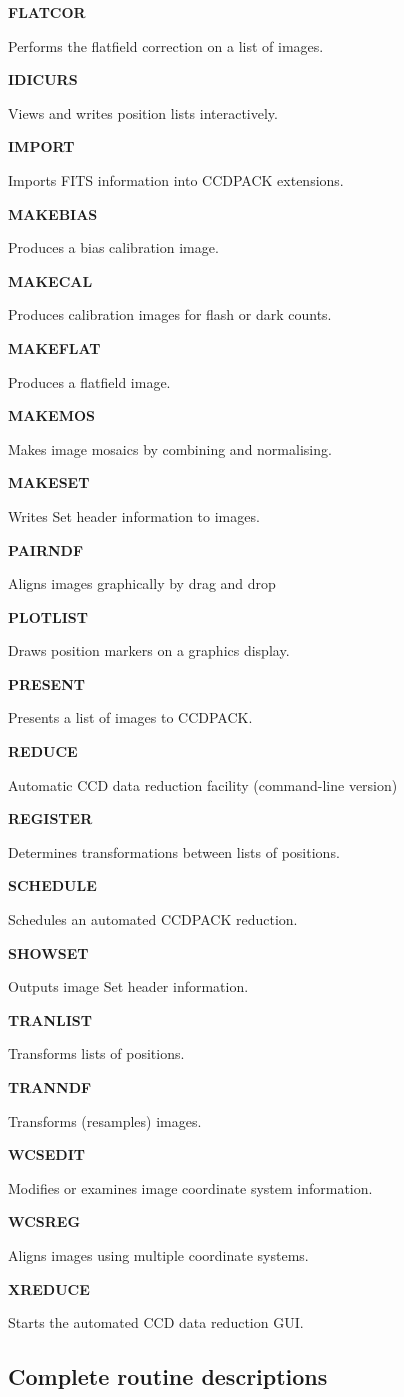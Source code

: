 \documentclass[twoside,11pt]{article}
\newenvironment{latexonly}{}{}
\renewcommand{\_}{\texttt{\symbol{95}}}
\newcommand{\quickdes}[3]{
                         \parbox{1.1in}{\bf #1}
                         \parbox{4.4in}{\raggedright #2 \dotfill}
                         \parbox{0.6in}{\pageref{#3}}
                         \vspace*{0.2in}}
\begin{document}
\begin{latexonly}
\quickdes{FLATCOR}{Performs the flatfield correction on a list of images.}
                  {FLATCOR}

\quickdes{IDICURS}{Views and writes position lists interactively.}{IDICURS}

\newpage

\quickdes{IMPORT}{Imports FITS information into CCDPACK extensions.}{IMPORT}

\quickdes{MAKEBIAS}{Produces a bias calibration image.}{MAKEBIAS}

\quickdes{MAKECAL}{Produces calibration images for flash or dark counts.}
                  {MAKECAL}

\quickdes{MAKEFLAT}{Produces a flatfield image.}
                   {MAKEFLAT}

\quickdes{MAKEMOS}{Makes image mosaics by combining and normalising.}
                  {MAKEMOS}

\quickdes{MAKESET}{Writes Set header information to images.}{MAKESET}

\quickdes{PAIRNDF}{Aligns images graphically by drag and drop}{PAIRNDF}

\quickdes{PLOTLIST}{Draws position markers on a graphics display.}
                   {PLOTLIST}

\quickdes{PRESENT}{Presents a list of images to CCDPACK.}{PRESENT}

\quickdes{REDUCE}{Automatic CCD data reduction facility (command-line version)}
                 {REDUCE}

\quickdes{REGISTER}{Determines transformations between lists of positions.}
                   {REGISTER}

\quickdes{SCHEDULE}{Schedules an automated CCDPACK reduction.}{SCHEDULE}

\quickdes{SHOWSET}{Outputs image Set header information.}{SHOWSET}

\quickdes{TRANLIST}{Transforms lists of positions.}
                   {TRANLIST}

\quickdes{TRANNDF}{Transforms (resamples) images.} {TRANNDF}

\quickdes{WCSEDIT}{Modifies or examines image coordinate system information.}
                  {WCSEDIT}

\quickdes{WCSREG}{Aligns images using multiple coordinate systems.}{WCSREG}

\quickdes{XREDUCE}{Starts the automated CCD data reduction GUI.}{XREDUCE}
\end{latexonly}

\subsection{Complete routine descriptions \label{descriptions}}
\end{document}
